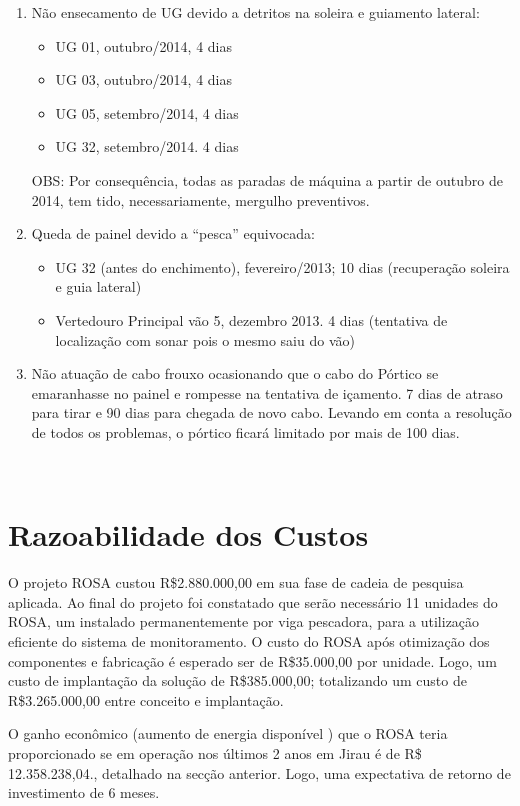 \begin{itemize}
\begin{enumerate}
  \item Não ensecamento de UG devido a detritos na soleira e guiamento lateral:
  		\begin{itemize}
  		  \item UG 01, outubro/2014, 4 dias
  		  \item UG 03, outubro/2014, 4 dias
  		  \item UG 05, setembro/2014, 4 dias
  		  \item UG 32, setembro/2014. 4 dias	
  		\end{itemize}
  		OBS: Por consequência, todas as paradas de máquina a partir de
  		outubro de 2014, tem tido, necessariamente, mergulho
  		preventivos. 
  \item Queda de painel devido a “pesca” equivocada:
  		\begin{itemize}
  		  \item UG 32 (antes do enchimento), fevereiro/2013; 10 dias (recuperação
  		  soleira e guia lateral)
  		  \item Vertedouro Principal vão 5, dezembro 2013. 4 dias (tentativa de
  		  localização com sonar pois o mesmo saiu do vão)
  		\end{itemize}
  \item Não atuação de cabo frouxo ocasionando que o cabo do Pórtico se
  emaranhasse no painel e rompesse na tentativa de içamento. 7 dias de atraso 
  para tirar e 90 dias para chegada de novo cabo. Levando em conta a resolução 
  de todos os problemas, o pórtico ficará limitado por mais de 100 dias.
\end{enumerate}
 
     
\section*{Razoabilidade dos Custos}
O projeto ROSA custou R\$2.880.000,00 em sua fase de cadeia de pesquisa
aplicada. Ao final do projeto foi constatado que serão necessário 11 unidades 
do ROSA, um instalado permanentemente por viga pescadora, para a utilização 
eficiente do sistema de monitoramento. O custo do ROSA após otimização dos 
componentes e fabricação é esperado ser de R\$35.000,00 por unidade. Logo, um
custo de implantação da solução de R\$385.000,00; totalizando um custo de
R\$3.265.000,00 entre conceito e implantação.

O ganho econômico (aumento de energia disponível ) que o ROSA teria proporcionado 
se em operação nos últimos 2 anos em Jirau é de R\$ 12.358.238,04., detalhado
na secção anterior. Logo, uma expectativa de retorno de investimento de 6 meses.


\end{itemize}
